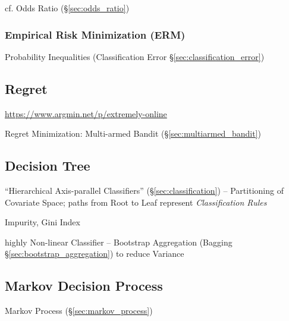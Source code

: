 cf. Odds Ratio (\S\ref{sec:odds_ratio})



\subsubsection{Empirical Risk Minimization (ERM)}\label{sec:erm}

Probability Inequalities (Classification Error \S\ref{sec:classification_error})



\subsection{Regret}\label{sec:regret}

\url{https://www.argmin.net/p/extremely-online}

Regret Minimization: Multi-armed Bandit (\S\ref{sec:multiarmed_bandit})



\subsection{Decision Tree}\label{sec:decision_tree}

``Hierarchical Axis-parallel Classifiers'' (\S\ref{sec:classification}) --
Partitioning of Covariate Space; paths from Root to Leaf represent
\emph{Classification Rules}

Impurity, Gini Index

highly Non-linear Classifier --
Bootstrap Aggregation (Bagging \S\ref{sec:bootstrap_aggregation}) to reduce
Variance



\subsection{Markov Decision Process}\label{sec:markov_decision}

Markov Process (\S\ref{sec:markov_process})



